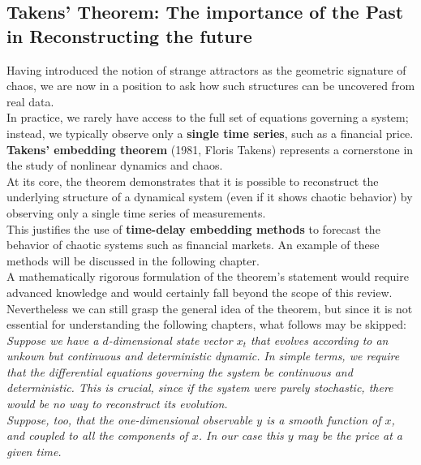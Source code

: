 \subsection{Takens' Theorem: The importance of the Past in Reconstructing the future}
Having introduced the notion of strange attractors as the geometric signature of chaos, we are now in a position to ask how such structures can be uncovered from real data.\\

In practice, we rarely have access to the full set of equations governing a system; instead, we typically observe only a \textbf{single time series}, such as a financial price.\\

\textbf{Takens' embedding theorem} (1981, Floris Takens) represents a cornerstone in the study of nonlinear dynamics and chaos.\\

At its core, the theorem demonstrates that it is possible to reconstruct the underlying structure of a dynamical system (even if it shows chaotic behavior) by observing only a single time series of measurements.\\

This justifies the use of \textbf{time-delay embedding methods} to forecast the behavior of chaotic systems such as financial markets. An example of these methods will be discussed in the following chapter.\\

A mathematically rigorous formulation of the theorem's statement would require advanced knowledge and would certainly fall beyond the scope of this review.\\

Nevertheless we can still grasp the general idea of the theorem, but since it is not essential for understanding the following chapters, what follows may be skipped:\\

\textit{Suppose we have a $d$-dimensional state vector $x_t$ that evolves according to an unkown but continuous and deterministic dynamic.} \textit{In simple terms, we require that the differential equations governing the system be continuous and deterministic. This is crucial, since if the system were purely stochastic, there would be no way to reconstruct its evolution.}\\
\textit{Suppose, too, that the one-dimensional observable $y$ is a smooth function of $x$, and coupled to all the components of $x$. In our case this $y$ may be the price at a given time.}\\

